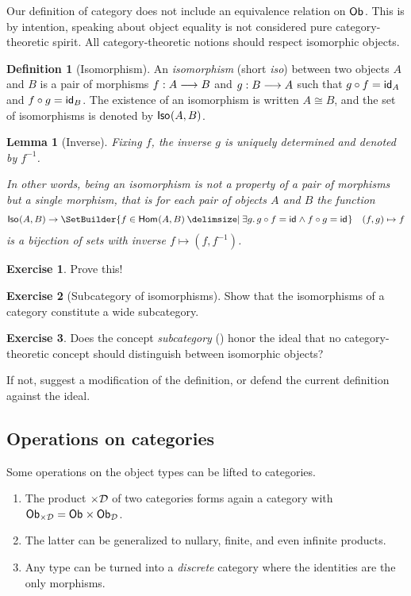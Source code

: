 \documentclass[a4paper,fleqn]{scrartcl}
\newtheorem{lemma}{Lemma}
\theoremstyle{definition}
\newtheorem{definition}{Definition}
\newtheorem{exercise}{Exercise}
\let\C\relax %
\newcommand{\C}{\mathcal{C}}
\begin{document}
Our definition of category does not include an equivalence relation on
$\Ob$.  This is by intention, speaking about object equality is not
considered pure category-theoretic spirit.  All category-theoretic
notions should respect isomorphic objects.
\begin{definition}[Isomorphism]
  An \emph{isomorphism} (short \emph{iso}) between two objects $A$ and
  $B$ is a pair of morphisms $f : A \too B$ and $g : B \too A$ such
  that $g \comp f = \id[A]$ and $f \comp g = \id[B]$.
  The existence of an isomorphism is written $A \cong B$, and the set
  of isomorphisms is denoted by $\Iso(A,B)$.
\end{definition}
\begin{lemma}[Inverse]
  Fixing $f$, the inverse $g$ is uniquely determined and denoted by $f^{-1}$.

  In other words, being an isomorphism is not a property of a pair of
  morphisms but a single morphism, that is for each pair of objects
  $A$ and $B$ the function
  \begin{gather*}
    \Iso(A,B) \rightarrow \SetBuilder{ f \in \Hom(A,B) \given \exists g.\,g \comp f = \id \wedge f \comp g = \id } \quad (f,g) \mapsto f
  \end{gather*}
  is a bijection of sets with inverse $f \mapsto (f,f^{-1})$.
\end{lemma}
\begin{exercise}
  Prove this!
\end{exercise}
\begin{exercise}[Subcategory of isomorphisms]
  Show that the isomorphisms of a category constitute a wide subcategory.
\end{exercise}
\begin{exercise}
  Does the concept \emph{subcategory} () honor the
  ideal that no category-theoretic concept should distinguish between
  isomorphic objects?

  If not, suggest a modification of the definition, or defend the
  current definition against the ideal.
\end{exercise}

\subsection{Operations on categories}

Some operations on the object types can be lifted to categories.
\begin{enumerate}
\item The product $\C \times \D$ of two categories forms again a
  category with $\Ob[\C \times \D] = \Ob[\C] \times \Ob[\D]$.
\item The latter can be generalized to nullary, finite, and even
  infinite products.
\item Any type can be turned into a \emph{discrete} category where the
  identities are the only morphisms.
\end{enumerate}
\end{document}
